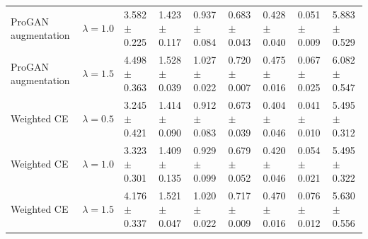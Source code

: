 \begin{tabular}{lllllllll}
ProGAN augmentation & $\lambda=1.0$ & \num{3.582} $\pm$ \num{0.225} & \num{1.423} $\pm$ \num{0.117} & \num{0.937} $\pm$ \num{0.084} & \num{0.683} $\pm$ \num{0.043} & \num{0.428} $\pm$ \num{0.040} & \num{0.051} $\pm$ \num{0.009} & \num{5.883} $\pm$ \num{0.529}\\
ProGAN augmentation & $\lambda=1.5$ & \num{4.498} $\pm$ \num{0.363} & \num{1.528} $\pm$ \num{0.039} & \num{1.027} $\pm$ \num{0.022} & \num{0.720} $\pm$ \num{0.007} & \num{0.475} $\pm$ \num{0.016} & \num{0.067} $\pm$ \num{0.025} & \num{6.082} $\pm$ \num{0.547}\\
Weighted CE & $\lambda=0.5$ & \num{3.245} $\pm$ \num{0.421} & \num{1.414} $\pm$ \num{0.090} & \num{0.912} $\pm$ \num{0.083} & \num{0.673} $\pm$ \num{0.039} & \num{0.404} $\pm$ \num{0.046} & \num{0.041} $\pm$ \num{0.010} & \num{5.495} $\pm$ \num{0.312}\\
Weighted CE & $\lambda=1.0$ & \num{3.323} $\pm$ \num{0.301} & \num{1.409} $\pm$ \num{0.135} & \num{0.929} $\pm$ \num{0.099} & \num{0.679} $\pm$ \num{0.052} & \num{0.420} $\pm$ \num{0.046} & \num{0.054} $\pm$ \num{0.021} & \num{5.495} $\pm$ \num{0.322}\\
Weighted CE & $\lambda=1.5$ & \num{4.176} $\pm$ \num{0.337} & \num{1.521} $\pm$ \num{0.047} & \num{1.020} $\pm$ \num{0.022} & \num{0.717} $\pm$ \num{0.009} & \num{0.470} $\pm$ \num{0.016} & \num{0.076} $\pm$ \num{0.012} & \num{5.630} $\pm$ \num{0.556}\\
\bottomrule
\end{tabular}
